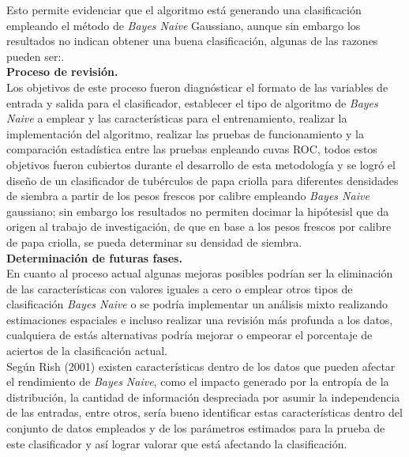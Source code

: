 Esto permite evidenciar que  el algoritmo está generando una clasificación empleando el método de
 \textit{Bayes Naive} Gaussiano, aunque sin embargo los resultados no indican obtener una buena clasificación, algunas de las razones pueden ser:.\\

\noindent
\textbf{Proceso de revisión.}\\

Los objetivos de este proceso fueron diagnósticar el formato de las
variables de entrada y salida para el clasificador, establecer el tipo de
algoritmo de \textit{Bayes Naive} a emplear y las características para el entrenamiento,
realizar la implementación del algoritmo, realizar las pruebas de funcionamiento
y la comparación estadística entre las pruebas enpleando cuvas ROC, todos estos objetivos fueron cubiertos durante el
desarrollo de esta metodología y se logró el diseño de un clasificador de tubérculos
de papa criolla para diferentes densidades de siembra a partir de los pesos frescos
por calibre empleando \textit{Bayes Naive} gaussiano; sin embargo los resultados no permiten docimar la hipótesisl que da origen al trabajo de investigación,  de que en base a los pesos frescos por calibre de papa criolla, se pueda determinar su densidad de siembra.\\

\noindent
\textbf{Determinación de futuras fases.}\\

En cuanto al proceso actual algunas mejoras posibles podrían ser la eliminación
de las características con valores iguales a cero o emplear otros tipos de clasificación \textit{Bayes Naive} o se podría implementar un análisis mixto realizando estimaciones  espaciales e incluso realizar una revisión más profunda a los datos, cualquiera de estás alternativas podría mejorar o empeorar el porcentaje de aciertos de la clasificación actual.\\

Según Rish (2001) existen características dentro de los datos que pueden afectar el
rendimiento de \textit{Bayes Naive}, como el impacto generado por la entropía de la distribución, la
cantidad de información despreciada por asumir la independencia de las entradas, entre otros,
sería bueno identificar estas características dentro del conjunto de datos empleados y de los parámetros estimados para la prueba de
este clasificador y así lograr valorar que está afectando la clasificación.